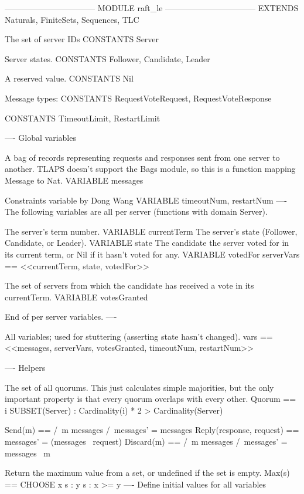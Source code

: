 --------------------------------- MODULE raft_le ---------------------------------
EXTENDS Naturals, FiniteSets, Sequences, TLC

\* The set of server IDs
CONSTANTS Server

\* Server states.
CONSTANTS Follower, Candidate, Leader

\* A reserved value.
CONSTANTS Nil

\* Message types:
CONSTANTS RequestVoteRequest, RequestVoteResponse

CONSTANTS TimeoutLimit, RestartLimit

----
\* Global variables

\* A bag of records representing requests and responses sent from one server
\* to another. TLAPS doesn't support the Bags module, so this is a function
\* mapping Message to Nat.
VARIABLE messages

\* Constraints variable by Dong Wang
VARIABLE timeoutNum, restartNum
----
\* The following variables are all per server (functions with domain Server).

\* The server's term number.
VARIABLE currentTerm
\* The server's state (Follower, Candidate, or Leader).
VARIABLE state
\* The candidate the server voted for in its current term, or
\* Nil if it hasn't voted for any.
VARIABLE votedFor
serverVars == <<currentTerm, state, votedFor>>

\* The set of servers from which the candidate has received a vote in its
\* currentTerm.
VARIABLE votesGranted


\* End of per server variables.
----

\* All variables; used for stuttering (asserting state hasn't changed).
vars == <<messages, serverVars, votesGranted, timeoutNum, restartNum>>

----
\* Helpers

\* The set of all quorums. This just calculates simple majorities, but the only
\* important property is that every quorum overlaps with every other.
Quorum == {i \in SUBSET(Server) : Cardinality(i) * 2 > Cardinality(Server)}          


Send(m) == /\ m \notin messages 
           /\ messages' = messages 
Reply(response, request) == messages' = (messages \ {request})  
Discard(m) == /\ m \in messages 
              /\ messages' = messages \ {m}


\* Return the maximum value from a set, or undefined if the set is empty.
Max(s) == CHOOSE x \in s : \A y \in s : x >= y
----
\* Define initial values for all variables

